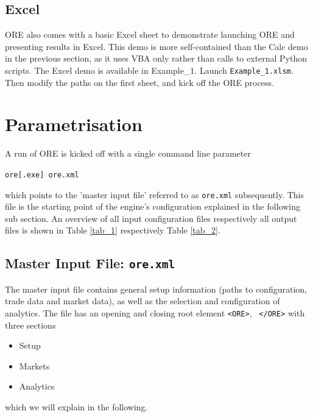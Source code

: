 \documentclass[12pt, a4paper]{article}
\begin{document}

\subsection{Excel}\label{sec:excel}

ORE also comes with a basic Excel sheet to demonstrate launching ORE and presenting results in Excel. This demo is more
self-contained than the Calc demo in the previous section, as it uses VBA only rather than calls to external Python
scripts. The Excel demo is available in Example\_1. Launch {\tt Example\_1.xlsm}. Then modify the paths on the first
sheet, and kick off the ORE process.

\section{Parametrisation}\label{sec:configuration}

A run of ORE is kicked off with a single command line parameter 

\medskip
\centerline{\tt ore[.exe] ore.xml}
\medskip

which points to the 'master input file' referred to  as {\tt ore.xml} subsequently. 
This file is the starting point of the engine's configuration explained in the following sub section.
An overview of all input configuration files respectively all output files is shown in Table \ref{tab_1} respectively Table \ref{tab_2}.

\subsection{Master Input File: {\tt ore.xml}}\label{sec:master_input}

The master input file contains general setup information (paths to configuration, trade data and market data), as well
as the selection and configuration of analytics. The file has an opening and closing root element {\tt <ORE>}, {\tt
  </ORE>} with three sections
\begin{itemize}
\item Setup
\item Markets
\item Analytics
\end{itemize}
which we will explain in the following.
\end{document}
